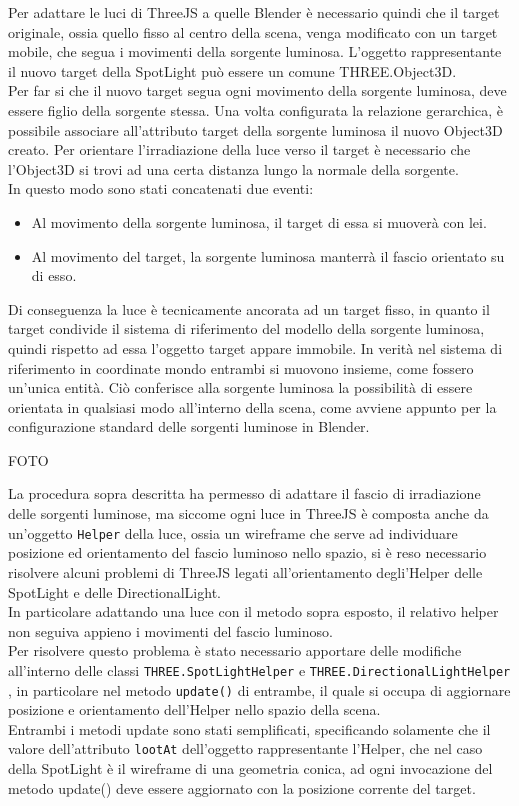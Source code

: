 Per adattare le luci di ThreeJS a quelle Blender è necessario quindi che il target originale, ossia quello fisso al centro della scena, venga modificato con un target mobile, che segua i movimenti della sorgente luminosa. L’oggetto rappresentante il nuovo target della SpotLight può essere un comune THREE.Object3D.
\\
Per far si che il nuovo target segua ogni movimento della sorgente luminosa, deve essere figlio della sorgente stessa. Una volta configurata la relazione gerarchica, è possibile associare all’attributo target della sorgente luminosa il nuovo Object3D creato. Per orientare l’irradiazione della luce verso il target è necessario che l’Object3D si trovi ad una certa distanza lungo la normale della sorgente.
\\
In questo modo sono stati concatenati due eventi:
\begin{itemize}
\item Al movimento della sorgente luminosa, il target di essa si muoverà con lei.
\item Al movimento del target, la sorgente luminosa manterrà il fascio orientato su di esso.
\end{itemize}
Di conseguenza la luce è tecnicamente ancorata ad un target fisso, in quanto il target condivide il sistema di riferimento del modello della sorgente luminosa, quindi rispetto ad essa l’oggetto target appare immobile. In verità nel sistema di riferimento in coordinate mondo entrambi si muovono insieme, come fossero un’unica entità. Ciò conferisce alla sorgente luminosa la possibilità di essere orientata in qualsiasi modo all’interno della scena, come avviene appunto per la configurazione standard delle sorgenti luminose in Blender.

FOTO

La procedura sopra descritta ha permesso di adattare il fascio di irradiazione delle sorgenti luminose, ma siccome ogni luce in ThreeJS è composta anche da un’oggetto \texttt{Helper} della luce, ossia un wireframe che serve ad individuare posizione ed orientamento del fascio luminoso nello spazio, si è reso necessario risolvere alcuni problemi di ThreeJS legati all’orientamento degli’Helper delle SpotLight e delle DirectionalLight.
\\ 
In particolare adattando una luce con il metodo sopra esposto, il relativo helper non seguiva appieno i movimenti del fascio luminoso.
\\
Per risolvere questo problema è stato necessario apportare delle modifiche all’interno delle classi \texttt{THREE.SpotLightHelper} e \texttt{THREE.DirectionalLightHelper} , in particolare nel metodo \texttt{update()} di entrambe, il quale si occupa di aggiornare posizione e orientamento dell’Helper nello spazio della scena.
\\
Entrambi i metodi update sono stati semplificati, specificando solamente che il valore dell’attributo \texttt{lootAt} dell’oggetto rappresentante l’Helper, che nel caso della SpotLight è il wireframe di una geometria conica, ad ogni invocazione del metodo update() deve essere aggiornato con la posizione corrente del target. 